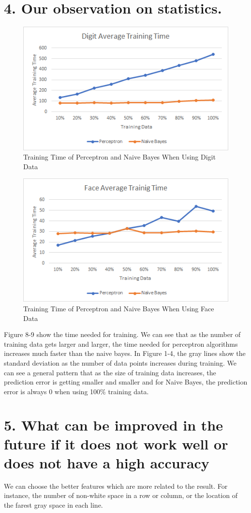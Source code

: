 \documentclass[11pt]{article}
\begin{document}
	\section*{4. Our observation on statistics.}
		\begin{figure}[H]
			\centering
			\includegraphics[scale=0.8]{Digit Average Training Time.jpg}
			\caption{Training Time of Perceptron and Naive Bayes When Using Digit Data}\label{fig:1}
		\end{figure}
		\begin{figure}[H]
			\centering
			\includegraphics[scale=0.8]{Face Average Training Time.jpg}
			\caption{Training Time of Perceptron and Naive Bayes When Using Face Data}\label{fig:1}
		\end{figure}
		\flushleft{}Figure 8-9 show the time needed for training. We can see that as the number of training data gets larger and larger, the time needed for perceptron algorithms increases much faster than the naive bayes.
		\flushleft{}In Figure 1-4, the gray lines show the standard deviation as the number of data points increases during training. We can see a general pattern that as the size of training data increases, the prediction error is getting smaller and smaller and for Naive Bayes, the prediction error is always 0 when using 100\% training data.


	\section*{5. What can be improved in the future if it does not work well or does not have a high accuracy}
		\flushleft{}We can choose the better features which are more related to the result. For instance, the number of non-white space in a row or column, or the location of the farest gray space in each line.
		
		
\end{document}
